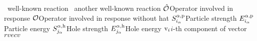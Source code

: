 %
	{\eep\ }{well-known reaction}
	{\eepp\ }{another well-known reaction}
%
	{${\hat{\cal O}}$}{Operator involved in response}
	{${{\cal O}}$}{Operator involved in response without hat}
	{$S^{\alpha,{\rm p}}_{i_{\alpha}}$}{Particle strength} 
	{$E^{\alpha,{\rm p}}_{i_{\alpha}}$}{Particle energy} 
	{$S^{\alpha,{\rm h}}_{j_{\alpha}}$}{Hole strength} 
	{$E^{\alpha,{\rm h}}_{j_{\alpha}}$}{Hole energy} 
	{${\rm v}_i$}{$i$-th component of vector $rvec{v}$} 
\def\phpr{^{\phantom{\prime}}}
